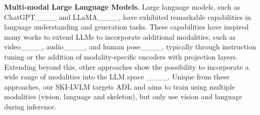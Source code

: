 \textbf{Multi-modal Large Language Models.}
Large language models, such as ChatGPT____ and LLaMA____, have exhibited remarkable capabilities in language understanding and generation tasks. These capabilities have inspired many works to extend LLMs to incorporate additional modalities, such as video____, audio____, and human pose____, typically through instruction tuning or the addition of modality-specific encoders with projection layers. Extending beyond this, other approaches show the possibility to incorporate a wide range of modalities into the LLM space
____. Unique 
from these approaches, our SKI-LVLM targets ADL and aims to train using multiple modalities (vision, language and skeleton), but only use vision and language during inference.